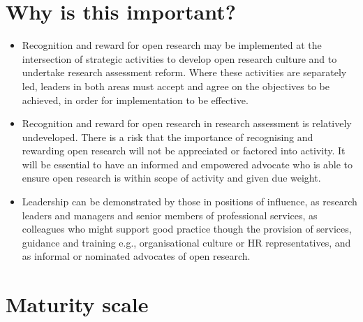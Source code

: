 \documentclass[
  letterpaper,
  DIV=11,
  numbers=noendperiod,
  oneside]{scrreprt}
\begin{document}
\section{Why is this important?}\label{why-is-this-important-1}

\begin{itemize}
\item
  Recognition and reward for open research may be implemented at the
  intersection of strategic activities to develop open research culture
  and to undertake research assessment reform. Where these activities
  are separately led, leaders in both areas must accept and agree on the
  objectives to be achieved, in order for implementation to be
  effective.
\item
  Recognition and reward for open research in research assessment is
  relatively undeveloped. There is a risk that the importance of
  recognising and rewarding open research will not be appreciated or
  factored into activity. It will be essential to have an informed and
  empowered advocate who is able to ensure open research is within scope
  of activity and given due weight.
\item
  Leadership can be demonstrated by those in positions of influence, as
  research leaders and managers and senior members of professional
  services, as colleagues who might support good practice though the
  provision of services, guidance and training e.g., organisational
  culture or HR representatives, and as informal or nominated advocates
  of open research.
\end{itemize}

\section{Maturity scale}\label{maturity-scale-1}
\end{document}
